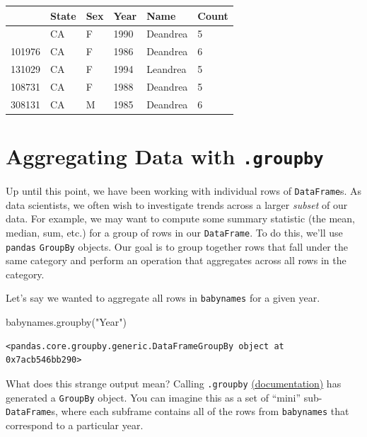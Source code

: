 \documentclass[
  letterpaper,
  DIV=11,
  numbers=noendperiod]{scrreprt}
\newenvironment{Shaded}{\begin{snugshade}}{\end{snugshade}}
\newcommand{\NormalTok}[1]{\textcolor[rgb]{0.00,0.23,0.31}{#1}}
\newcommand{\StringTok}[1]{\textcolor[rgb]{0.13,0.47,0.30}{#1}}
\begin{document}
\begin{longtable}[]{@{}llllll@{}}
\toprule\noalign{}
& State & Sex & Year & Name & Count \\
\midrule\noalign{}
\endhead
\bottomrule\noalign{}
\endlastfoot
115957 & CA & F & 1990 & Deandrea & 5 \\
101976 & CA & F & 1986 & Deandrea & 6 \\
131029 & CA & F & 1994 & Leandrea & 5 \\
108731 & CA & F & 1988 & Deandrea & 5 \\
308131 & CA & M & 1985 & Deandrea & 6 \\
\end{longtable}

\section{\texorpdfstring{Aggregating Data with
\texttt{.groupby}}{Aggregating Data with .groupby}}\label{aggregating-data-with-.groupby}

Up until this point, we have been working with individual rows of
\texttt{DataFrame}s. As data scientists, we often wish to investigate
trends across a larger \emph{subset} of our data. For example, we may
want to compute some summary statistic (the mean, median, sum, etc.) for
a group of rows in our \texttt{DataFrame}. To do this, we'll use
\texttt{pandas} \texttt{GroupBy} objects. Our goal is to group together
rows that fall under the same category and perform an operation that
aggregates across all rows in the category.

Let's say we wanted to aggregate all rows in \texttt{babynames} for a
given year.

\begin{Shaded}
\begin{Highlighting}[]
\NormalTok{babynames.groupby(}\StringTok{"Year"}\NormalTok{)}
\end{Highlighting}
\end{Shaded}

\begin{verbatim}
<pandas.core.groupby.generic.DataFrameGroupBy object at 0x7acb546bb290>
\end{verbatim}

What does this strange output mean? Calling \texttt{.groupby}
\href{https://pandas.pydata.org/pandas-docs/stable/reference/api/pandas.DataFrame.groupby.html}{(documentation)}
has generated a \texttt{GroupBy} object. You can imagine this as a set
of ``mini'' sub-\texttt{DataFrame}s, where each subframe contains all of
the rows from \texttt{babynames} that correspond to a particular year.
\end{document}
